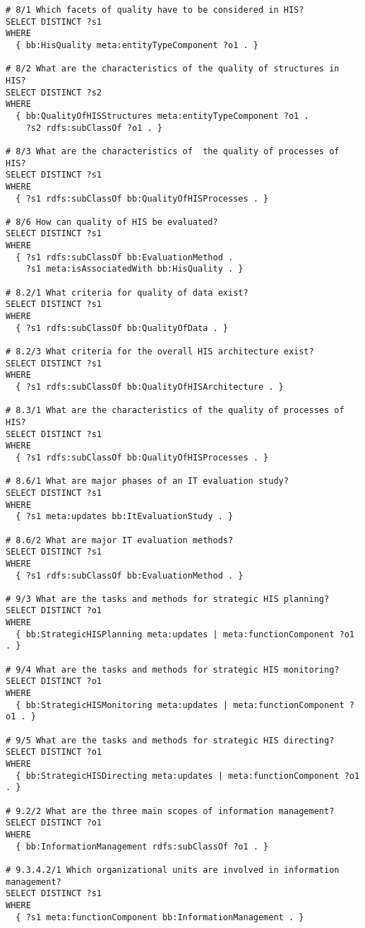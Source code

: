 \begin{lstlisting}[language=SPARQL]
# 8/1 Which facets of quality have to be considered in HIS?
SELECT DISTINCT ?s1
WHERE
  { bb:HisQuality meta:entityTypeComponent ?o1 . }

# 8/2 What are the characteristics of the quality of structures in HIS?
SELECT DISTINCT ?s2
WHERE
  { bb:QualityOfHISStructures meta:entityTypeComponent ?o1 .
    ?s2 rdfs:subClassOf ?o1 . }

# 8/3 What are the characteristics of  the quality of processes of HIS?
SELECT DISTINCT ?s1
WHERE
  { ?s1 rdfs:subClassOf bb:QualityOfHISProcesses . }

# 8/6 How can quality of HIS be evaluated?
SELECT DISTINCT ?s1
WHERE
  { ?s1 rdfs:subClassOf bb:EvaluationMethod .
    ?s1 meta:isAssociatedWith bb:HisQuality . }

# 8.2/1 What criteria for quality of data exist?
SELECT DISTINCT ?s1
WHERE
  { ?s1 rdfs:subClassOf bb:QualityOfData . }

# 8.2/3 What criteria for the overall HIS architecture exist?
SELECT DISTINCT ?s1
WHERE
  { ?s1 rdfs:subClassOf bb:QualityOfHISArchitecture . }

# 8.3/1 What are the characteristics of the quality of processes of HIS?
SELECT DISTINCT ?s1
WHERE
  { ?s1 rdfs:subClassOf bb:QualityOfHISProcesses . }

# 8.6/1 What are major phases of an IT evaluation study?
SELECT DISTINCT ?s1
WHERE
  { ?s1 meta:updates bb:ItEvaluationStudy . }

# 8.6/2 What are major IT evaluation methods?
SELECT DISTINCT ?s1
WHERE
  { ?s1 rdfs:subClassOf bb:EvaluationMethod . }

# 9/3 What are the tasks and methods for strategic HIS planning?
SELECT DISTINCT ?o1
WHERE
  { bb:StrategicHISPlanning meta:updates | meta:functionComponent ?o1 . }

# 9/4 What are the tasks and methods for strategic HIS monitoring?
SELECT DISTINCT ?o1
WHERE
  { bb:StrategicHISMonitoring meta:updates | meta:functionComponent ?o1 . }

# 9/5 What are the tasks and methods for strategic HIS directing?
SELECT DISTINCT ?o1
WHERE
  { bb:StrategicHISDirecting meta:updates | meta:functionComponent ?o1 . }

# 9.2/2 What are the three main scopes of information management?
SELECT DISTINCT ?o1
WHERE
  { bb:InformationManagement rdfs:subClassOf ?o1 . }

# 9.3.4.2/1 Which organizational units are involved in information management?
SELECT DISTINCT ?s1
WHERE
  { ?s1 meta:functionComponent bb:InformationManagement . }


\end{lstlisting}
